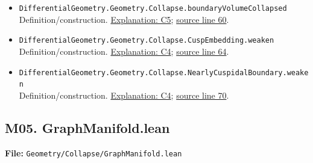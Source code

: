 \documentclass[
  letterpaper,
  11pt]{article}
\begin{document}
\begin{itemize}
{  line 56}.
\item
  {\small\texttt{Differential\allowbreak{}Geometry.\allowbreak{}Geometry.\allowbreak{}Collapse.\allowbreak{}boundary\allowbreak{}Volume\allowbreak{}Collapsed}}\\
  Definition/construction.
  \hyperref[collapse-boundarydistance]{Explanation: C5};
  \href{https://github.com/qinz1yang/differential-geometry-dev/blob/ea0fae60ee01ef8c8d9b57a51794c6538f679c5d/DifferentialGeometry/Geometry/Collapse/CuspBoundary.lean\#L60}{source
  line 60}.
\item
  {\small\texttt{Differential\allowbreak{}Geometry.\allowbreak{}Geometry.\allowbreak{}Collapse.\allowbreak{}Cusp\allowbreak{}Embedding.\allowbreak{}weaken}}\\
  Definition/construction.
  \hyperref[collapse-cuspembedding]{Explanation: C4};
  \href{https://github.com/qinz1yang/differential-geometry-dev/blob/ea0fae60ee01ef8c8d9b57a51794c6538f679c5d/DifferentialGeometry/Geometry/Collapse/CuspBoundary.lean\#L64}{source
  line 64}.
\item
  {\small\texttt{Differential\allowbreak{}Geometry.\allowbreak{}Geometry.\allowbreak{}Collapse.\allowbreak{}Nearly\allowbreak{}Cuspidal\allowbreak{}Boundary.\allowbreak{}weaken}}\\
  Definition/construction.
  \hyperref[collapse-cuspembedding]{Explanation: C4};
  \href{https://github.com/qinz1yang/differential-geometry-dev/blob/ea0fae60ee01ef8c8d9b57a51794c6538f679c5d/DifferentialGeometry/Geometry/Collapse/CuspBoundary.lean\#L70}{source
  line 70}.
\end{itemize}


\subsection{M05. GraphManifold.lean}\label{m05.-graphmanifold.lean}

\textbf{File:}
{\small\texttt{Geometry/\allowbreak{}Collapse/\allowbreak{}Graph\allowbreak{}Manifold.\allowbreak{}lean}}
\end{document}
